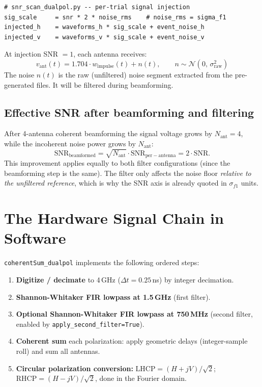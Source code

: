 \documentclass[11pt,letterpaper]{article}
\newenvironment{codebox}{%
  \begin{mdframed}[backgroundcolor=codebg,linewidth=0.5pt,innerleftmargin=6pt,innerrightmargin=6pt,innertopmargin=4pt,innerbottommargin=4pt]%
  \small}{\end{mdframed}}
\begin{document}
\begin{codebox}
\begin{Verbatim}
# snr_scan_dualpol.py -- per-trial signal injection
sig_scale     = snr * 2 * noise_rms    # noise_rms = sigma_f1
injected_h    = waveforms_h * sig_scale + event_noise_h
injected_v    = waveforms_v * sig_scale + event_noise_v
\end{Verbatim}
\end{codebox}

At injection SNR $= 1$, each antenna receives:
\[
  v_\mathrm{ant}(t) = 1.704 \cdot w_\mathrm{impulse}(t) + n(t),
  \qquad n \sim \mathcal{N}(0,\,\sigma_\mathrm{raw}^2)
\]
The noise $n(t)$ is the raw (unfiltered) noise segment extracted from the
pre-generated files. It will be filtered during beamforming.

\subsection{Effective SNR after beamforming and filtering}

After 4-antenna coherent beamforming the signal voltage grows by $N_\mathrm{ant}
= 4$, while the incoherent noise power grows by $N_\mathrm{ant}$:
\[
  \mathrm{SNR}_\mathrm{beamformed} = \sqrt{N_\mathrm{ant}} \cdot \mathrm{SNR}_\mathrm{per-antenna}
  = 2 \cdot \mathrm{SNR}.
\]
This improvement applies equally to both filter configurations (since the
beamforming step is the same). The filter only affects the noise floor
\emph{relative to the unfiltered reference}, which is why the SNR axis is
already quoted in $\sigma_{f1}$ units.

\section{The Hardware Signal Chain in Software}
\label{sec:chain}

\texttt{coherentSum\_dualpol} implements the following ordered steps:

\begin{enumerate}
  \item \textbf{Digitize / decimate} to 4\,GHz ($\Delta t = 0.25$\,ns) by
        integer decimation.
  \item \textbf{Shannon-Whitaker FIR lowpass at 1.5\,GHz} (first filter).
  \item \textbf{Optional Shannon-Whitaker FIR lowpass at 750\,MHz} (second
        filter, enabled by \texttt{apply\_second\_filter=True}).
  \item \textbf{Coherent sum} each polarization:
        apply geometric delays (integer-sample roll) and sum all antennas.
  \item \textbf{Circular polarization conversion:}
        $\mathrm{LHCP} = (H + jV)/\sqrt{2}$;
        $\mathrm{RHCP} = (H - jV)/\sqrt{2}$, done in the Fourier domain.
\end{enumerate}
\end{document}
